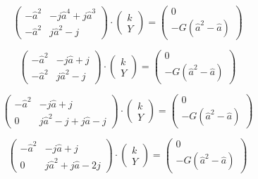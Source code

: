 \documentclass{article}
\begin{document}
$$
    \begin{pmatrix}
        -\hat{a}^2 & - j \hat{a}^4 + j \hat{a}^3 \\
        -\hat{a}^2 & j \hat{a}^2 - j
    \end{pmatrix}
    \cdot
    \begin{pmatrix}
        k \\
        Y
    \end{pmatrix}
    =
    \begin{pmatrix}
        0 \\
        - G (\hat{a}^2 - \hat{a})
    \end{pmatrix}
$$

$$
    \begin{pmatrix}
        -\hat{a}^2 & - j \hat{a} + j \\
        -\hat{a}^2 & j \hat{a}^2 - j
    \end{pmatrix}
    \cdot
    \begin{pmatrix}
        k \\
        Y
    \end{pmatrix}
    =
    \begin{pmatrix}
        0 \\
        - G (\hat{a}^2 - \hat{a})
    \end{pmatrix}
$$

$$
    \begin{pmatrix}
        -\hat{a}^2 & - j \hat{a} + j                 \\
        0          & j \hat{a}^2 - j + j \hat{a} - j
    \end{pmatrix}
    \cdot
    \begin{pmatrix}
        k \\
        Y
    \end{pmatrix}
    =
    \begin{pmatrix}
        0 \\
        - G (\hat{a}^2 - \hat{a})
    \end{pmatrix}
$$

$$
    \begin{pmatrix}
        -\hat{a}^2 & - j \hat{a} + j               \\
        0          & j \hat{a}^2 + j \hat{a} - 2 j
    \end{pmatrix}
    \cdot
    \begin{pmatrix}
        k \\
        Y
    \end{pmatrix}
    =
    \begin{pmatrix}
        0 \\
        - G (\hat{a}^2 - \hat{a})
    \end{pmatrix}
$$
\end{document}

